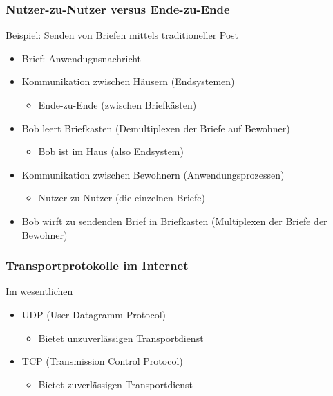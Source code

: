     \subsubsection{Nutzer-zu-Nutzer versus Ende-zu-Ende}
      Beispiel: Senden von Briefen mittels traditioneller Post
      \begin{itemize}
        \item Brief: Anwendugnsnachricht
        \item Kommunikation zwischen Häusern (Endsystemen)
          \begin{itemize}
            \item Ende-zu-Ende (zwischen Briefkästen)
          \end{itemize}
        \item Bob leert Briefkasten (Demultiplexen der Briefe auf Bewohner)
          \begin{itemize}
            \item Bob ist im Haus (also Endsystem)
          \end{itemize}
        \item Kommunikation zwischen Bewohnern (Anwendungsprozessen)
          \begin{itemize}
            \item Nutzer-zu-Nutzer (die einzelnen Briefe)
          \end{itemize}
        \item Bob wirft zu sendenden Brief in Briefkasten (Multiplexen der Briefe der Bewohner)
      \end{itemize}
    \subsubsection{Transportprotokolle im Internet}
      Im wesentlichen
      \begin{itemize}
        \item UDP (User Datagramm Protocol)
          \begin{itemize}
            \item Bietet unzuverlässigen Transportdienst
          \end{itemize}
        \item TCP (Transmission Control Protocol)
            \begin{itemize}
              \item Bietet zuverlässigen Transportdienst
            \end{itemize}
      \end{itemize}
